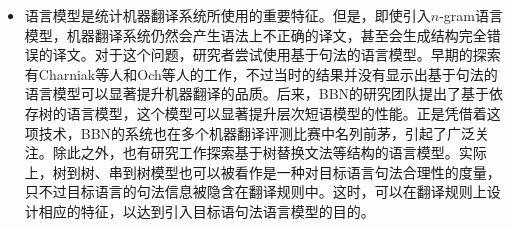 \begin{itemize}
\vspace{0.5em}
\item 语言模型是统计机器翻译系统所使用的重要特征。但是，即使引入$n$-gram语言模型，机器翻译系统仍然会产生语法上不正确的译文，甚至会生成结构完全错误的译文。对于这个问题，研究者尝试使用基于句法的语言模型。早期的探索有Charniak等人\cite{charniak2001immediate}和Och等人\cite{och2004smorgasbord}的工作，不过当时的结果并没有显示出基于句法的语言模型可以显著提升机器翻译的品质。后来，BBN的研究团队提出了基于依存树的语言模型\cite{shen2008a}，这个模型可以显著提升层次短语模型的性能。正是凭借着这项技术，BBN的系统也在多个机器翻译评测比赛中名列前茅，引起了广泛关注。除此之外，也有研究工作探索基于树替换文法等结构的语言模型\cite{xiao2011language}。实际上，树到树、串到树模型也可以被看作是一种对目标语言句法合理性的度量，只不过目标语言的句法信息被隐含在翻译规则中。这时，可以在翻译规则上设计相应的特征，以达到引入目标语句法语言模型的目的。
\vspace{0.5em}
\end{itemize}
